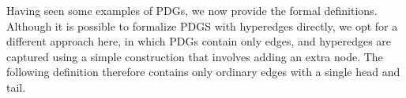 \documentclass{article}
\newcommand{\MN}{PDG}
\newcommand{\MNs}{\MN s}
\numberwithin{equation}{section}
\begin{document}
	Having seen some examples of \MNs, we now provide the formal
        definitions.
	Although it is possible to formalize PDGS with hyperedges directly,
        we opt for a different approach here, in which PDGs 
		contain only edges,
	 	and hyperedges are captured using a simple construction
        that involves adding an extra node.
        	The following definition therefore contains only ordinary
        edges with a single head and tail.%
\end{document}
